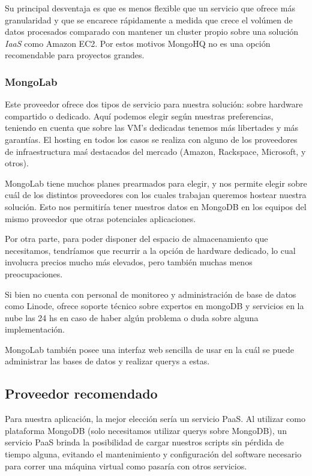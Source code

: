 \documentclass[a4paper,10pt,twoside]{article}
\begin{document}
Su principal desventaja es que es menos flexible que un servicio que ofrece más granularidad y que se encarece rápidamente a medida que crece el volúmen de datos procesados comparado con mantener un cluster propio sobre una solución \emph{IaaS} como Amazon EC2. Por estos motivos MongoHQ no es una opción recomendable para proyectos grandes.


\subsubsection{MongoLab}

Este proveedor ofrece dos tipos de servicio para nuestra solución: sobre hardware compartido o dedicado. Aquí podemos elegir según nuestras preferencias, teniendo en cuenta que sobre las VM's dedicadas tenemos más libertades y más garantías. El hosting en todos los casos se realiza con alguno de los proveedores de infraestructura maś destacados del mercado (Amazon, Rackspace, Microsoft, y otros).

MongoLab tiene muchos planes prearmados para elegir, y nos permite elegir sobre cuál de los distintos proveedores con los cuales trabajan queremos hostear nuestra solución. Esto nos permitiría tener nuestros datos en MongoDB en los equipos del mismo proveedor que otras potenciales aplicaciones.

Por otra parte, para poder disponer del espacio de almacenamiento que necesitamos, tendríamos que recurrir a la opción de hardware dedicado, lo cual involucra precios mucho más elevados, pero también muchas menos preocupaciones.

Si bien no cuenta con personal de monitoreo y administración de base de datos como Linode, ofrece soporte técnico sobre expertos en mongoDB y servicios en la nube las 24 hs en caso de haber algún problema o duda sobre alguna implementación.

MongoLab también posee una interfaz web sencilla de usar en la cuál se puede administrar las bases de datos y realizar querys a estas.

\subsection{Proveedor recomendado}

Para nuestra aplicación, la mejor elección sería un servicio PaaS. Al utilizar como plataforma MongoDB (solo necesitamos utilizar querys sobre MongoDB), un servicio PaaS brinda la posibilidad de cargar nuestros scripts sin pérdida de tiempo alguna, evitando el mantenimiento y configuración del software necesario para correr una máquina virtual como pasaría con otros servicios.
\end{document}
